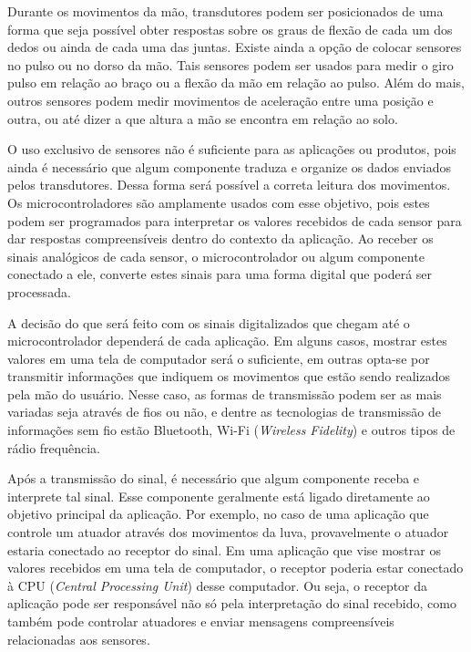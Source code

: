\documentclass[
	12pt,				%
	openright,			%
	oneside,			%
	a4paper,			%
	english,			%
	brazil				%
	]{abntex2}
\begin{document}
		Durante os movimentos da mão, transdutores podem ser posicionados de uma forma que seja possível obter respostas sobre os graus de flexão de cada um dos dedos ou ainda de cada uma das juntas. Existe ainda a opção de colocar sensores no pulso ou no dorso da mão. Tais sensores podem ser usados para medir o giro pulso em relação ao braço ou a flexão da mão em relação ao pulso. Além do mais, outros sensores podem medir movimentos de aceleração entre uma posição e outra, ou até dizer a que altura a mão se encontra em relação ao solo.
		
		O uso exclusivo de sensores não é suficiente para as aplicações ou produtos, pois ainda é necessário que algum componente traduza e organize os dados enviados pelos transdutores. Dessa forma será possível a correta leitura dos movimentos. Os microcontroladores são amplamente usados com esse objetivo, pois estes podem ser programados para interpretar os valores recebidos de cada sensor para dar respostas compreensíveis dentro do contexto da aplicação. Ao receber os sinais analógicos de cada sensor, o microcontrolador ou algum componente conectado a ele, converte estes sinais para uma forma digital que poderá ser processada. 
	
		A decisão do que será feito com os sinais digitalizados que chegam até o microcontrolador dependerá de cada aplicação. Em alguns casos, mostrar estes valores em uma tela de computador será o suficiente, em outras opta-se por transmitir informações que indiquem os movimentos que estão sendo realizados pela mão do usuário. Nesse caso, as formas de transmissão podem ser as mais variadas seja através de fios ou não, e dentre as tecnologias de transmissão de informações sem fio estão Bluetooth, Wi-Fi (\textit{Wireless Fidelity}) e outros tipos de rádio frequência.

		Após a transmissão do sinal, é necessário que algum componente receba e interprete tal sinal. Esse componente geralmente está ligado diretamente ao objetivo principal da aplicação. Por exemplo, no caso de uma aplicação que controle um atuador através dos movimentos da luva, provavelmente o atuador estaria conectado ao receptor do sinal. Em uma aplicação que vise mostrar os valores recebidos em uma tela de computador, o receptor poderia estar conectado à CPU (\textit{Central Processing Unit}) desse computador. Ou seja, o receptor da aplicação pode ser responsável não só pela interpretação do sinal recebido, como também pode controlar atuadores e enviar mensagens compreensíveis relacionadas aos sensores.
\end{document}
